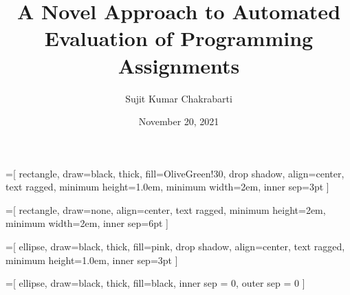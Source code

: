 \documentclass[aspectratio=169]{beamer}
\title[Sujit]{A Novel Approach to Automated Evaluation of Programming Assignments}
\author{Sujit Kumar Chakrabarti}
\institute{IIITB}
\date{November 20, 2021}
\begin{document}
\maketitle

\newcommand{\highlight}[1]{{\color{Red}(#1)}}
\newcommand{\comment}[1]{\begin{tiny}
	{\color{blue}(#1)}
	\end{tiny}
}
\newcommand{\keyword}[1]{{\color{mydarkgreen}\textbf{\texttt{#1}}}}
\newcommand{\code}[1]{
	{\color{mydarkgreen}
		\begin{alltt}
			{#1}
		\end{alltt}
	}
}
\newcommand{\myheader}[1]{
	{\color{darkblue}
		\begin{Large}
			\begin{center}
				{#1}
			\end{center}
		\end{Large}
	}
}
\newcommand{\myminorheader}[1]{
	{\color{purple}
		\begin{large}
			{#1}
		\end{large}
	}
}

\newcommand{\myprod}[0]{\hspace{0.5cm}$::=$\hspace{0.5cm}}
\newcommand{\mychoice}[0]{\hspace{0.75cm}$|$\hspace{0.25cm}}

=[%
      rectangle, draw=black, thick, fill=OliveGreen!30, drop shadow, align=center,
      text ragged, minimum height=1.0em, minimum width=2em, inner sep=3pt
]

=[%
      rectangle, draw=none,  align=center,
      text ragged, minimum height=2em, minimum width=2em, inner sep=6pt
]

=[%
      ellipse, draw=black, thick, fill=pink, drop shadow, align=center,
      text ragged, minimum height=1.0em, inner sep=3pt
]

=[%
      ellipse, draw=black, thick, fill=black, inner sep = 0, outer sep = 0
]
\end{document}
